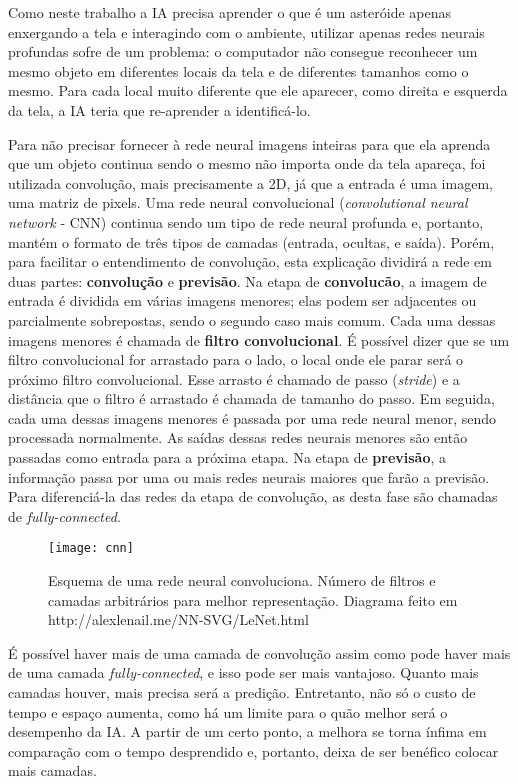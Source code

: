 Como neste trabalho a IA precisa aprender o que é um asteróide apenas enxergando a tela e interagindo com o ambiente, utilizar apenas redes neurais profundas sofre de um problema:
o computador não consegue reconhecer um mesmo objeto em diferentes locais da tela e de diferentes tamanhos como o mesmo.
Para cada local muito diferente que ele aparecer, como direita e esquerda da tela, a IA teria que re-aprender a identificá-lo.

Para não precisar fornecer à rede neural imagens inteiras para que ela aprenda que um objeto continua sendo o mesmo não importa onde da tela apareça, foi utilizada convolução, mais precisamente a 2D, já que a entrada é uma imagem, uma matriz de pixels.
Uma rede neural convolucional (\textit{convolutional neural network} - CNN) continua sendo um tipo de rede neural profunda e, portanto, mantém o formato de três tipos de camadas (entrada, ocultas, e saída). Porém, para facilitar o entendimento de convolução, esta explicação dividirá a rede em duas partes: \textbf{convolução} e \textbf{previsão}.
Na etapa de \textbf{convolucão}, a imagem de entrada é dividida em várias imagens menores; elas podem ser adjacentes ou parcialmente sobrepostas, sendo o segundo caso mais comum.
Cada uma dessas imagens menores é chamada de \textbf{filtro convolucional}.
É possível dizer que se um filtro convolucional for arrastado para o lado, o local onde ele parar será o próximo filtro convolucional.
Esse arrasto é chamado de passo (\textit{stride}) e a distância que o filtro é arrastado é chamada de tamanho do passo.
Em seguida, cada uma dessas imagens menores é passada por uma rede neural menor, sendo processada normalmente.
As saídas dessas redes neurais menores são então passadas como entrada para a próxima etapa.
Na etapa de \textbf{previsão}, a informação passa por uma ou mais redes neurais maiores que farão a previsão. Para diferenciá-la das redes da etapa de convolução, as desta fase são chamadas de \textit{fully-connected}.

\begin{figure}[h!]
\texttt{[image: cnn]}
\centering
\caption{Esquema de uma rede neural convoluciona. Número de filtros e camadas arbitrários para melhor representação. Diagrama feito em http://alexlenail.me/NN-SVG/LeNet.html}
\end{figure}

É possível haver mais de uma camada de convolução assim como pode haver mais de uma camada \textit{fully-connected}, e isso pode ser mais vantajoso. 
Quanto mais camadas houver, mais precisa será a predição.
Entretanto, não só o custo de tempo e espaço aumenta, como há um limite para o quão melhor será o desempenho da IA.
A partir de um certo ponto, a melhora se torna ínfima em comparação com o tempo desprendido e, portanto, deixa de ser benéfico colocar mais camadas.

